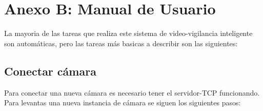 \chapter{Anexo B: Manual de Usuario}

La mayoria de las tareas que realiza este sistema de video-vigilancia inteligente son automáticas, pero las tareas más basicas a describir son las siguientes:

\section*{Conectar cámara}
Para conectar una nueva cámara es necesario tener el servidor-TCP funcionando. Para levantas una nueva instancia de cámara se siguen los siguientes pasos:
